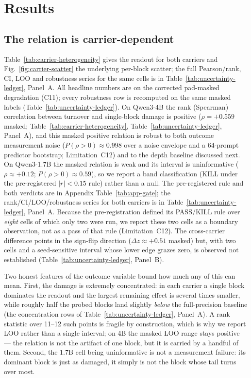 \documentclass{article}
\begin{document}
\section{Results}
\label{sec:results}

\subsection{The relation is carrier-dependent}
\label{sec:results-main}
Table~\ref{tab:carrier-heterogeneity} gives the readout for both carriers and
Fig.~\ref{fig:carrier-scatter} the underlying per-block scatter; the full Pearson/rank, CI,
LOO and robustness series for the same cells is in Table~\ref{tab:uncertainty-ledger}, Panel~A.
All headline numbers are on the corrected pad-masked degradation (C11); every robustness row is
recomputed on the same masked labels (Table~\ref{tab:uncertainty-ledger}).
On Qwen3-4B the rank (Spearman) correlation between turnover and single-block damage is
positive ($\rho=+0.559$ masked; Table~\ref{tab:carrier-heterogeneity},
Table~\ref{tab:uncertainty-ledger}, Panel~A), and this masked positive relation is robust to
both outcome measurement noise ($P(\rho>0)\approx0.998$ over a noise envelope and a
64-prompt predictor bootstrap; Limitation~C12) and to the depth baseline discussed next.
On Qwen3-1.7B the masked relation is weak and its interval is uninformative
($\rho\approx+0.12$; $P(\rho>0)\approx0.59$), so we report a band classification
(KILL under the pre-registered $|r|<0.15$ rule) rather than a null. The pre-registered rule and
both verdicts are in Appendix Table~\ref{tab:app-gate}; the rank/CI/LOO/robustness series for
both carriers is in Table~\ref{tab:uncertainty-ledger}, Panel~A. Because the pre-registration
defined its PASS/KILL rule over \emph{eight} cells of which only two were run, we report these
two cells as a boundary observation, not as a pass of that rule (Limitation~C12). The
cross-carrier difference points in the sign-flip direction ($\Delta z\approx+0.51$ masked) but,
with two cells and a seed-sensitive interval whose lower edge grazes zero, is observed not
established (Table~\ref{tab:uncertainty-ledger}, Panel~B).

Two honest features of the outcome variable bound how much any of this can mean. First, the
damage is extremely concentrated: in each carrier a single block dominates the readout and the
largest remaining effect is several times smaller, while roughly half the probed blocks land
slightly \emph{below} the full-precision baseline (the concentration rows of
Table~\ref{tab:uncertainty-ledger}, Panel~A). A rank statistic over 11--12 such points is
fragile by construction, which is why we report LOO rather than a single interval; on 4B the
masked LOO range stays positive --- the relation is not the artifact of one block, but it is
carried by a handful of them. Second, the 1.7B cell being uninformative is not a measurement
failure: its dominant block is just as damaged, it simply is not the block whose tail turns
over most.
\end{document}
